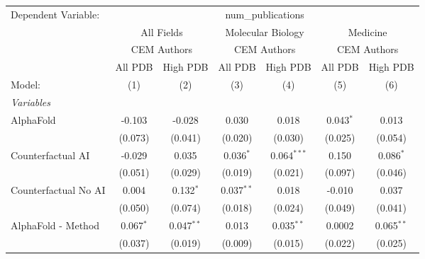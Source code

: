 \begingroup
\centering
\begin{tabular}{lcccccc}
   \tabularnewline \midrule \midrule
   Dependent Variable: & \multicolumn{6}{c}{num\_publications}\\
 & \multicolumn{2}{c}{All Fields} & \multicolumn{2}{c}{Molecular Biology} & \multicolumn{2}{c}{Medicine} \\
\cmidrule(lr){2-3} \cmidrule(lr){4-5} \cmidrule(lr){6-7}
 & \multicolumn{2}{c}{CEM Authors} & \multicolumn{2}{c}{CEM Authors} & \multicolumn{2}{c}{CEM Authors} \\
\cmidrule(lr){2-3} \cmidrule(lr){4-5} \cmidrule(lr){6-7}
 & \multicolumn{1}{c}{All PDB} & \multicolumn{1}{c}{High PDB} & \multicolumn{1}{c}{All PDB} & \multicolumn{1}{c}{High PDB} & \multicolumn{1}{c}{All PDB} & \multicolumn{1}{c}{High PDB} \\
\cmidrule(lr){2-2} \cmidrule(lr){3-3} \cmidrule(lr){4-4} \cmidrule(lr){5-5} \cmidrule(lr){6-6} \cmidrule(lr){7-7}
   Model:                                                     & (1)         & (2)          & (3)          & (4)           & (5)         & (6)\\  
   \midrule
   \emph{Variables}\\
   AlphaFold                                                  & -0.103      & -0.028       & 0.030        & 0.018         & 0.043$^{*}$ & 0.013\\   
                                                              & (0.073)     & (0.041)      & (0.020)      & (0.030)       & (0.025)     & (0.054)\\   
   Counterfactual AI                                          & -0.029      & 0.035        & 0.036$^{*}$  & 0.064$^{***}$ & 0.150       & 0.086$^{*}$\\   
                                                              & (0.051)     & (0.029)      & (0.019)      & (0.021)       & (0.097)     & (0.046)\\   
   Counterfactual No AI                                       & 0.004       & 0.132$^{*}$  & 0.037$^{**}$ & 0.018         & -0.010      & 0.037\\   
                                                              & (0.050)     & (0.074)      & (0.018)      & (0.024)       & (0.049)     & (0.041)\\   
   AlphaFold - Method                                         & 0.067$^{*}$ & 0.047$^{**}$ & 0.013        & 0.035$^{**}$  & 0.0002      & 0.065$^{**}$\\   
                                                              & (0.037)     & (0.019)      & (0.009)      & (0.015)       & (0.022)     & (0.025)\\   

\end{tabular}
